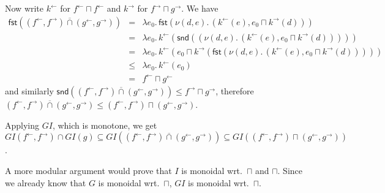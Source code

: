 \documentclass[9pt]{article}
\newcommand{\ff}{{f^{\rightarrow}}}
\newcommand{\fb}{{f^{\leftarrow}}}
\newcommand{\gf}{{g^{\rightarrow}}}
\newcommand{\gb}{{g^{\leftarrow}}}
\newcommand{\kf}{{k^{\rightarrow}}}
\newcommand{\kb}{{k^{\leftarrow}}}
\newcommand{\bigjoin}{\bigsqcup}
\newcommand{\meet}{\sqcap}
\newcommand{\con}{\wedge}
\newcommand{\fst}{\mathsf{fst}}
\newcommand{\snd}{\mathsf{snd}}
\newcommand{\caplift}{\mathbin{\overline{\cap}}}
\begin{document}
Now write $\kb$ for $\fb \meet \fb$ and $\kf$ for $\ff \meet \gf$. We have
\begin{eqnarray*}
  \fst ((\fb,\ff) \caplift (\gb,\gf)) & = & \lambda e_0.\, \fst (\nu (d,e).\, (\kb (e), e_0 \meet \kf (d))) \\
& = & \lambda e_0.\, \kb (\snd ( (\nu (d,e).\, (\kb(e), e_0 \meet \kf(d))) )) \\
& = & \lambda e_0.\, \kb (e_0 \meet \kf (\fst (\nu (d,e).\, (\kb (e), e_0 \meet \kf (d))))) \\
& \leq & \lambda e_0.\, \kb (e_0) \\
& = & \fb \meet \gb
\end{eqnarray*}
and similarly $\snd ((\fb,\ff) \caplift (\gb,\gf)) \leq \ff \meet \gf$, therefore
$(\fb,\ff) \caplift (\gb,\gf) \leq (\fb,\ff) \meet (\gb,\gf)$.

Applying $GI$, which is monotone, we get
$GI (\fb,\ff) \cap GI (g) \subseteq GI ((\fb,\ff) \caplift (\gb,\gf))
\subseteq GI ((\fb,\ff) \meet (\gb,\gf))$.

A more modular argument would prove that $I$ is monoidal wrt.\ $\meet$
and $\meet$.  Since we already know that $G$ is monoidal wrt.\
$\meet$, $GI$ is monoidal wrt.\ $\meet$.







  
\end{document}
